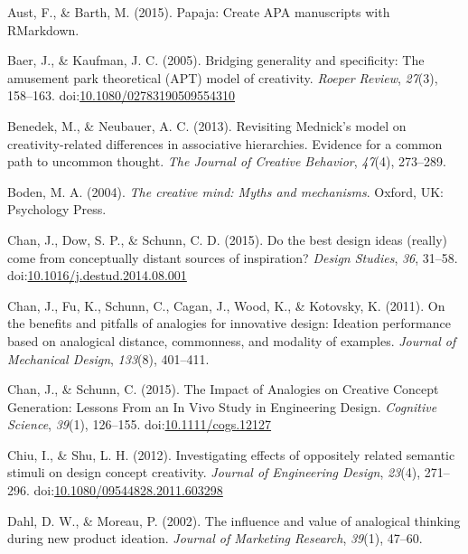 \documentclass[english,man]{apa6}
\begin{document}
\leavevmode\hypertarget{ref-R-papaja}{}%
Aust, F., \& Barth, M. (2015). Papaja: Create APA manuscripts with
RMarkdown.

\leavevmode\hypertarget{ref-baer_bridging_2005}{}%
Baer, J., \& Kaufman, J. C. (2005). Bridging generality and specificity:
The amusement park theoretical (APT) model of creativity. \emph{Roeper
Review}, \emph{27}(3), 158--163.
doi:\href{https://doi.org/10.1080/02783190509554310}{10.1080/02783190509554310}

\leavevmode\hypertarget{ref-benedek2013revisiting}{}%
Benedek, M., \& Neubauer, A. C. (2013). Revisiting Mednick's model on
creativity-related differences in associative hierarchies. Evidence for
a common path to uncommon thought. \emph{The Journal of Creative
Behavior}, \emph{47}(4), 273--289.

\leavevmode\hypertarget{ref-boden2004creative}{}%
Boden, M. A. (2004). \emph{The creative mind: Myths and mechanisms}.
Oxford, UK: Psychology Press.

\leavevmode\hypertarget{ref-chan_best_2015}{}%
Chan, J., Dow, S. P., \& Schunn, C. D. (2015). Do the best design ideas
(really) come from conceptually distant sources of inspiration?
\emph{Design Studies}, \emph{36}, 31--58.
doi:\href{https://doi.org/10.1016/j.destud.2014.08.001}{10.1016/j.destud.2014.08.001}

\leavevmode\hypertarget{ref-Chanbenefitspitfallsanalogies2011}{}%
Chan, J., Fu, K., Schunn, C., Cagan, J., Wood, K., \& Kotovsky, K.
(2011). On the benefits and pitfalls of analogies for innovative design:
Ideation performance based on analogical distance, commonness, and
modality of examples. \emph{Journal of Mechanical Design},
\emph{133}(8), 401--411.

\leavevmode\hypertarget{ref-chan_impact_2015}{}%
Chan, J., \& Schunn, C. (2015). The Impact of Analogies on Creative
Concept Generation: Lessons From an In Vivo Study in Engineering Design.
\emph{Cognitive Science}, \emph{39}(1), 126--155.
doi:\href{https://doi.org/10.1111/cogs.12127}{10.1111/cogs.12127}

\leavevmode\hypertarget{ref-chiu_investigating_2012}{}%
Chiu, I., \& Shu, L. H. (2012). Investigating effects of oppositely
related semantic stimuli on design concept creativity. \emph{Journal of
Engineering Design}, \emph{23}(4), 271--296.
doi:\href{https://doi.org/10.1080/09544828.2011.603298}{10.1080/09544828.2011.603298}

\leavevmode\hypertarget{ref-dahl_influence_2002}{}%
Dahl, D. W., \& Moreau, P. (2002). The influence and value of analogical
thinking during new product ideation. \emph{Journal of Marketing
Research}, \emph{39}(1), 47--60.
\end{document}
